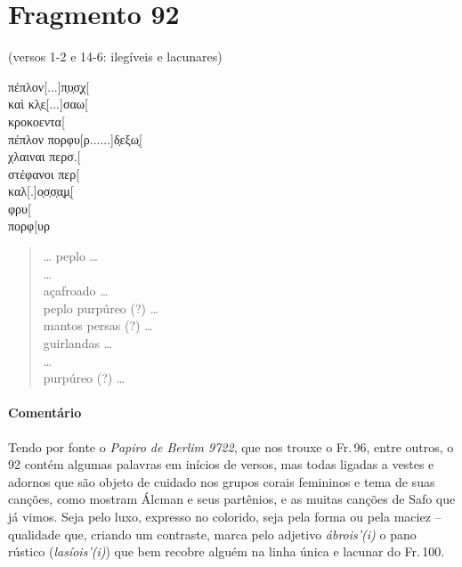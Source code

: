 

\section{Fragmento 92} 

\begin{gkverse}
\textnormal{(versos 1-2 e 14-6: ilegíveis e lacunares) }

πέπλον[...]π̣υ̣σ̣χ[\\
καὶ κλ̣ε̣[...]σαω[\\
κροκοεντα[\\
πέπλον πορφυ[ρ......]δ̣εξω̣[\\
χλαιναι περσ.[\\
στέφανοι περ[\\
καλ[.]ο̣σ̣σ̣α̣μ̣[\\
φρυ[\\
πορφ[υρ
\end{gkverse}

\begin{verse}
\ldots{} peplo \ldots{}\\ 
\ldots{}\\
açafroado \ldots{}\\
peplo purpúreo (?) \ldots{}\\
mantos persas (?) \ldots{}\\
guirlandas \ldots{}\\
\ldots{}\\
purpúreo (?) \ldots{}
\end{verse}

{\paragraph{Comentário} Tendo por fonte o \textit{Papiro de Berlim 9722}, que nos trouxe o Fr.\,96, entre outros, o 92 contém algumas palavras em inícios de versos, mas todas ligadas a vestes e adornos que são objeto de cuidado nos grupos corais femininos e tema de suas canções, como mostram Álcman e seus partênios, e as muitas canções de Safo que já vimos. Seja pelo luxo, expresso no colorido, seja pela forma ou pela maciez -- qualidade que, criando um contraste, marca pelo adjetivo \textit{ábrois'(i)} o pano rústico (\textit{lasíois'(i)}) que bem recobre alguém na linha única e lacunar do Fr.\,100.}



